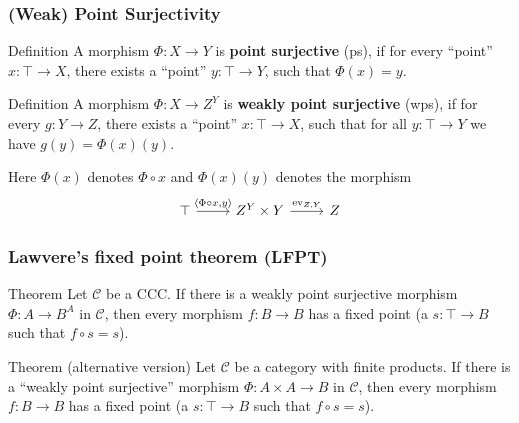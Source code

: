 \documentclass{beamer}
\begin{document}
\begin{frame}[fragile]
  \frametitle{(Weak) Point Surjectivity}
  \begin{block}{Definition}
    A morphism $\Phi : X \rightarrow Y$ is \textbf{point surjective} (ps), if for every ``point'' $x : \top \rightarrow X$, there exists a ``point'' $y : \top \rightarrow Y$, such that $\Phi (x) = y$.
  \end{block}
  \begin{block}{Definition}
    A morphism $\Phi : X \rightarrow Z ^ Y$ is \textbf{weakly point surjective} (wps), if for every $g : Y \rightarrow Z$, there exists a ``point'' $x : \top \rightarrow X$, such that for all $y : \top \rightarrow Y$ we have $g(y) = \Phi(x)(y)$.
    \end{block}
    Here $\Phi (x)$ denotes $\Phi \circ x$ and $\Phi (x)(y)$ denotes the morphism
    \[\begin{tikzcd}
	    \top & {Z^Y \times Y} & Z
	    \arrow["{\langle \Phi \circ x, y \rangle}", from=1-1, to=1-2]
	    \arrow["{\text{ev}_{Z,Y}}", from=1-2, to=1-3]
    \end{tikzcd}\]
\end{frame}

\begin{frame}
  \frametitle{Lawvere's fixed point theorem (LFPT)}
  \begin{alertblock}{Theorem}
    Let $\mathcal{C}$ be a CCC. If there is a weakly point surjective morphism $\Phi : A \rightarrow B ^ A$ in $\mathcal{C}$, then every morphism $f : B \rightarrow B$ has a fixed point (a $s : \top \rightarrow B$ such that $f \circ s = s$).
  \end{alertblock}
  \begin{alertblock}{Theorem (alternative version)}
    Let $\mathcal{C}$ be a category with finite products. If there is a ``weakly point surjective'' morphism $\Phi : A \times A \rightarrow B$ in $\mathcal{C}$, then every morphism $f : B \rightarrow B$ has a fixed point (a $s : \top \rightarrow B$ such that $f \circ s = s$).
  \end{alertblock}
\end{frame}
\end{document}
